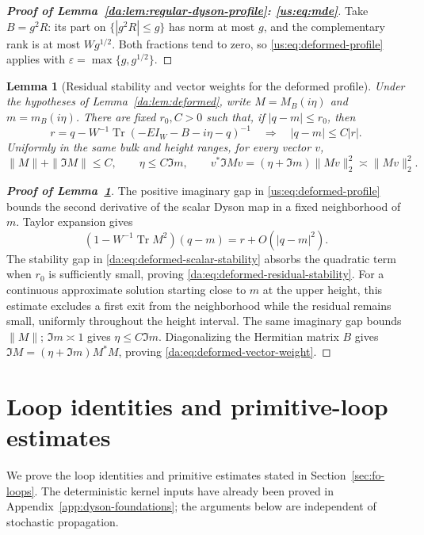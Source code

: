 \documentclass[11pt]{article}
\numberwithin{equation}{section}
\newtheorem{lemma}[theorem]{Lemma}
\theoremstyle{remark}
\newcommand{\Tr}{\operatorname{Tr}}
\begin{document}
\begin{proof}[\textbf{Proof of Lemma~\ref{da:lem:regular-dyson-profile}: \eqref{us:eq:mde}}]
Take $B=g^2R$:
its part on $\{|g^2R|\le g\}$ has norm at most $g$, and the
complementary rank is at most $Wg^{1/2}$. Both fractions tend to zero,
so \eqref{us:eq:deformed-profile} applies with
$\varepsilon=\max\{g,g^{1/2}\}$.
\end{proof}



\begin{lemma}[Residual stability and vector weights for the deformed profile]
\label{da:lem:deformed-stability}
Under the hypotheses of Lemma~\ref{da:lem:deformed}, write
$M=M_B(i\eta)$ and $m=m_B(i\eta)$. There are fixed $r_0,C>0$
such that, if $|q-m|\le r_0$, then
\begin{equation}\label{da:eq:deformed-residual-stability}
 r=q-W^{-1}\Tr(-EI_W-B-i\eta-q)^{-1}
 \quad\Longrightarrow\quad |q-m|\le C|r|.
\end{equation}
Uniformly in the same bulk and height ranges, for every vector $v$,
\begin{equation}\label{da:eq:deformed-vector-weight}
 \|M\|+\|\Im M\|\le C,\qquad \eta\le C\Im m,\qquad
 v^*\Im Mv=(\eta+\Im m)\|Mv\|_2^2\asymp\|Mv\|_2^2.
\end{equation}
\end{lemma}
\begin{proof}[\textbf{Proof of Lemma~\ref{da:lem:deformed-stability}}]
The positive imaginary gap in \eqref{us:eq:deformed-profile} bounds
the second derivative of the scalar Dyson map in a fixed neighborhood
of $m$. Taylor expansion gives
\[
 (1-W^{-1}\Tr M^2)(q-m)=r+O(|q-m|^2).
\]
The stability gap in \eqref{da:eq:deformed-scalar-stability} absorbs the
quadratic term when $r_0$ is sufficiently small, proving
\eqref{da:eq:deformed-residual-stability}. For a continuous approximate
solution starting close to $m$ at the upper height, this estimate
excludes a first exit from the neighborhood while the residual remains
small, uniformly throughout the height interval.
The same imaginary gap bounds $\|M\|$; $\Im m\asymp1$ gives
$\eta\le C\Im m$. Diagonalizing the Hermitian matrix $B$ gives
$\Im M=(\eta+\Im m)M^*M$, proving
\eqref{da:eq:deformed-vector-weight}.
\end{proof}

\section{Loop identities and primitive-loop estimates}\label{app:loop-identities}
We prove the loop identities and primitive estimates stated in
Section~\ref{sec:fo-loops}. The deterministic kernel inputs have already
been proved in Appendix~\ref{app:dyson-foundations}; the arguments below
are independent of stochastic propagation.
\end{document}
